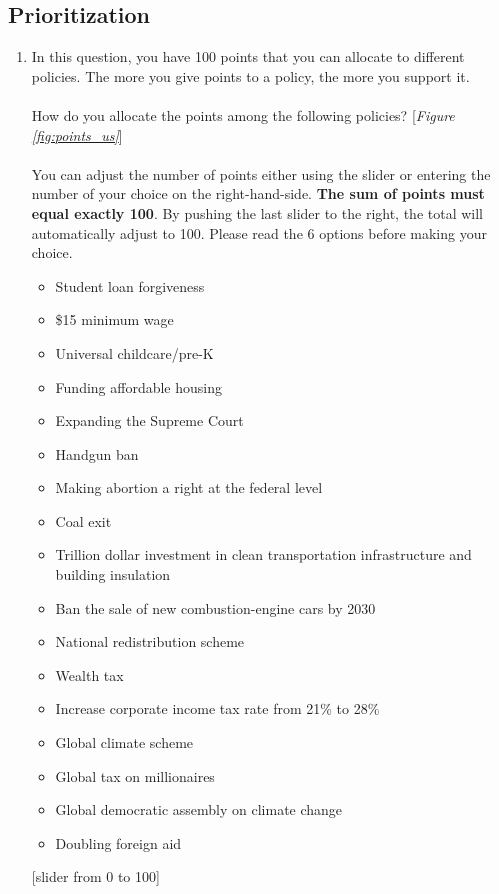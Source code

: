 \subsection*{Prioritization}
\begin{enumerate}[resume] \item \label{q:points_us} In this question, you have 100 points that you can allocate to different policies. The more you give points to a policy, the more you support it.\\ 
   \\
    How do you allocate the points among the following policies? [\textit{Figure \ref{fig:points_us}}]  \\
    \\
    You can adjust the number of points either using the slider or entering the number of your choice on the right-hand-side. \textbf{The sum of points must equal exactly 100}. By pushing the last slider to the right, the total will automatically adjust to 100. Please read the 6 options before making your choice.
\begin{itemize}
    \item Student loan forgiveness
    \item \$15 minimum wage 
    \item Universal childcare/pre-K 
    \item Funding affordable housing 
    \item Expanding the Supreme Court 
    \item Handgun ban 
    \item Making abortion a right at the federal level 
    \item Coal exit 
    \item Trillion dollar investment in clean transportation infrastructure and building insulation 
    \item Ban the sale of new combustion-engine cars by 2030 
    \item National redistribution scheme 
    \item Wealth tax 
    \item Increase corporate income tax rate from 21\% to 28\% 
    \item Global climate scheme 
    \item Global tax on millionaires 
    \item Global democratic assembly on climate change 
    \item Doubling foreign aid 
\end{itemize}
[slider from 0 to 100]
\end{enumerate}

